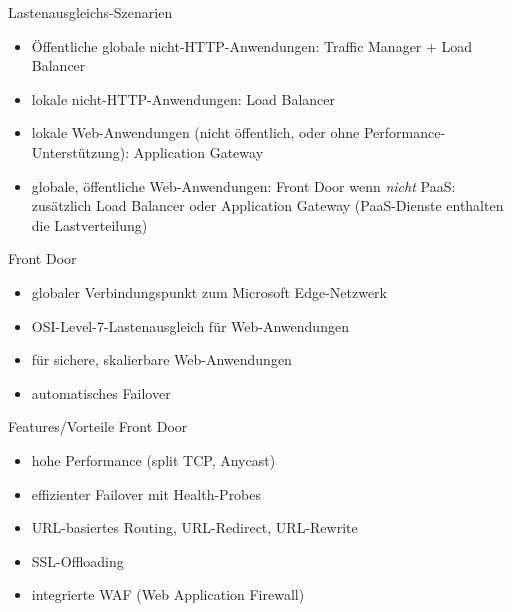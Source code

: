 \begin{flashcard}[]{Lastenausgleichs-Szenarien}
  \begin{itemize}
    \item Öffentliche globale nicht-HTTP-Anwendungen: Traffic Manager + Load Balancer
    \item lokale nicht-HTTP-Anwendungen: Load Balancer
    \item lokale Web-Anwendungen (nicht öffentlich, oder ohne Performance-Unterstützung): Application Gateway
    \item globale, öffentliche Web-Anwendungen: Front Door\newline
      wenn \emph{nicht} PaaS: zusätzlich Load Balancer oder Application Gateway\newline
      (PaaS-Dienste enthalten die Lastverteilung)
  \end{itemize}
\end{flashcard}

\begin{flashcard}[]{Front Door}
  \begin{itemize}
    \item globaler Verbindungspunkt zum Microsoft Edge-Netzwerk
    \item OSI-Level-7-Lastenausgleich für Web-Anwendungen
    \item für sichere, skalierbare Web-Anwendungen
    \item automatisches Failover
  \end{itemize}
\end{flashcard}

\begin{flashcard}[]{Features/Vorteile Front Door}
  \begin{itemize}
    \item hohe Performance (split TCP, Anycast)
    \item effizienter Failover mit Health-Probes
    \item URL-basiertes Routing, URL-Redirect, URL-Rewrite
    \item SSL-Offloading
    \item integrierte WAF (Web Application Firewall)
  \end{itemize}
\end{flashcard}

